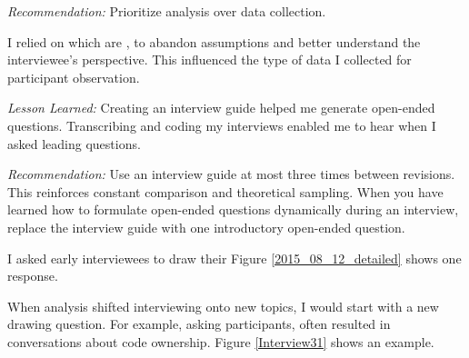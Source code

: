 \textit{Recommendation:} Prioritize analysis over data collection. 

I relied on  which are  \cite{Charmaz}, to abandon assumptions and better understand the interviewee's perspective. This influenced the type of data I collected for participant observation. 

\textit{Lesson Learned:} Creating an interview guide helped me generate open-ended questions. Transcribing and coding my interviews enabled me to hear when I asked leading questions.

\textit{Recommendation:} Use an interview guide at most three times between revisions. This reinforces constant comparison and theoretical sampling. When you have learned how to formulate open-ended questions dynamically during an interview, replace the interview guide with one introductory open-ended question. %

I asked early interviewees to draw their  Figure \ref{2015_08_12_detailed} shows one response. 

When analysis shifted interviewing onto new topics, I would start with a new drawing question. For example, asking participants,  often resulted in conversations about code ownership. Figure \ref{Interview31} shows an example. 

